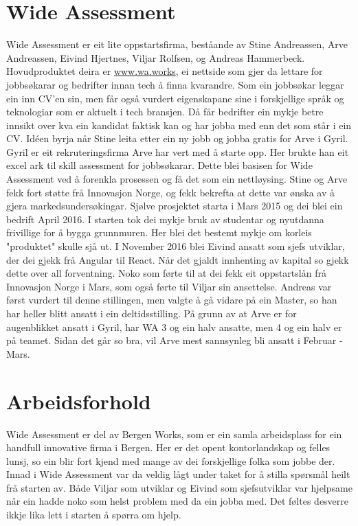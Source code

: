 \documentclass[12pt]{article}
\begin{document}
\section{Wide Assessment}

Wide Assessment er eit lite oppstartsfirma, beståande av Stine Andreassen,
Arve Andreassen, Eivind Hjertnes, Viljar Rolfsen, og Andreas Hammerbeck.
Hovudproduktet deira er \url{www.wa.works}, ei nettside som gjer da lettare for jobbsøkarar
og bedrifter innan tech å finna kvarandre. Som ein jobbsøkar leggar ein inn CV'en
sin, men får også vurdert eigenskapane sine i forskjellige språk og teknologiar
som er aktuelt i tech bransjen. Då får bedrifter ein mykje betre innsikt over
kva ein kandidat faktisk kan og har jobba med enn det som står i ein CV.
Idéen byrja når Stine leita etter ein ny jobb og jobba gratis for Arve i Gyril.
Gyril er eit rekruteringsfirma Arve har vert med å starte opp. Her brukte han
eit excel ark til skill assessment for jobbsøkarar. Dette blei basisen for Wide
Assessment ved å forenkla prosessen og få det som ein nettløysing. Stine og Arve
fekk fort støtte frå Innovasjon Norge, og fekk bekrefta at dette var ønska av å
gjera markedsundersøkingar. Sjølve prosjektet starta i Mars 2015 og dei blei ein
bedrift April 2016. I starten tok dei mykje bruk av studentar og nyutdanna frivillige
for å bygga grunnmuren. Her blei det bestemt mykje om korleis "produktet" skulle
sjå ut. I November 2016 blei Eivind ansatt som sjefs utviklar, der dei gjekk frå
Angular til React. Når det gjaldt innhenting av kapital so gjekk dette over all
forventning. Noko som førte til at dei fekk eit oppstartslån frå Innovasjon Norge
i Mars, som også førte til Viljar sin ansettelse. Andreas var først vurdert til
denne stillingen, men valgte å gå vidare på ein Master, so han har heller blitt
ansatt i ein deltidsstilling. På grunn av at Arve er for augenblikket ansatt i
Gyril, har WA 3 og ein halv ansatte, men 4 og ein halv er på teamet. Sidan det går so
bra, vil Arve mest sannsynleg bli ansatt i Februar - Mars.

\section{Arbeidsforhold}

Wide Assessment er del av Bergen Works, som er ein samla arbeidsplass for ein
handfull innovative firma i Bergen. Her er det opent kontorlandskap og felles
lunsj, so ein blir fort kjend med mange av dei forskjellige folka som jobbe der.
Innad i Wide Assessment var da veldig lågt under taket for å stilla spørsmål heilt
frå starten av. Både Viljar som utviklar og Eivind som sjefsutviklar var hjelpsame
når ein hadde noko som helst problem med da ein jobba med. Det føltes desverre ikkje
lika lett i starten å spørra om hjelp.
\end{document}
